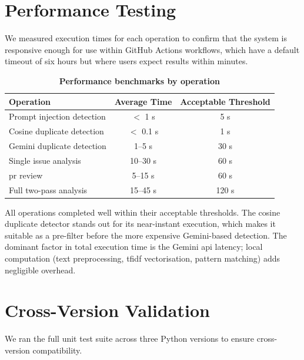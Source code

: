 \section{Performance Testing}

We measured execution times for each operation to confirm that the system is responsive enough for use within GitHub Actions workflows, which have a default timeout of six hours but where users expect results within minutes.

\begin{table}[htb]
\centering
\renewcommand{\arraystretch}{1.3}
\setlength{\arrayrulewidth}{0.5mm}
\fontsize{10}{12}\selectfont
\caption[Performance benchmarks by operation]{\textbf{Performance benchmarks by operation}}
\vspace{2mm}
\label{tab:performance}
\begin{tabular}{|p{5cm}|c|c|}
\hline
\textbf{Operation} & \textbf{Average Time} & \textbf{Acceptable Threshold} \\
\hline
Prompt injection detection & $<$ 1 s & 5 s \\
\hline
Cosine duplicate detection & $<$ 0.1 s & 1 s \\
\hline
Gemini duplicate detection & 1--5 s & 30 s \\
\hline
Single issue analysis & 10--30 s & 60 s \\
\hline
\gls{pr} review & 5--15 s & 60 s \\
\hline
Full two-pass analysis & 15--45 s & 120 s \\
\hline
\end{tabular}
\end{table}

All operations completed well within their acceptable thresholds. The cosine duplicate detector stands out for its near-instant execution, which makes it suitable as a pre-filter before the more expensive Gemini-based detection. The dominant factor in total execution time is the Gemini \gls{api} latency; local computation (text preprocessing, \gls{tfidf} vectorisation, pattern matching) adds negligible overhead.

\section{Cross-Version Validation}

We ran the full unit test suite across three Python versions to ensure cross-version compatibility.

